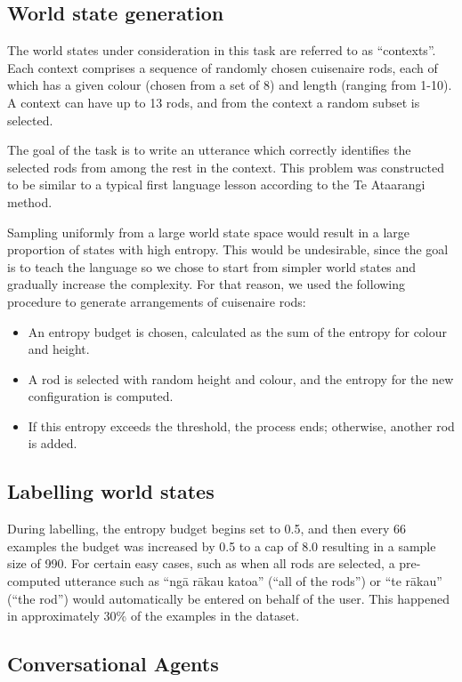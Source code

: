 \subsection{World state generation}

The world states under consideration in this task are referred to as ``contexts''. Each context comprises a sequence of randomly chosen cuisenaire rods, each of which has a given colour (chosen from a set of 8) and length (ranging from 1-10). A context can have up to 13 rods, and from the context a random subset is selected.

The goal of the task is to write an utterance which correctly identifies the selected rods from among the rest in the context. This problem was constructed to be similar to a typical first language lesson according to the Te Ataarangi method.

Sampling uniformly from a large world state space would result in a large proportion of states with high entropy. This would be undesirable, since the goal is to teach the language so we chose to start from simpler world states and gradually increase the complexity. For that reason, we used the following procedure to generate arrangements of cuisenaire rods:

\begin{itemize}
\item An entropy budget is chosen, calculated as the sum of the entropy for colour and height.
\item A rod is selected with random height and colour, and the entropy for the new configuration is computed.
\item If this entropy exceeds the threshold, the process ends; otherwise, another rod is added.
\end{itemize}

\subsection{Labelling world states}

During labelling, the entropy budget begins set to 0.5, and then every 66 examples the budget was increased by 0.5 to a cap of 8.0 resulting in a sample size of 990. For certain easy cases, such as when all rods are selected, a pre-computed utterance such as ``ngā rākau katoa'' (``all of the rods'') or ``te rākau'' (``the rod'') would automatically be entered on behalf of the user. This happened in approximately 30\% of the examples in the dataset.

\subsection{Conversational Agents}

